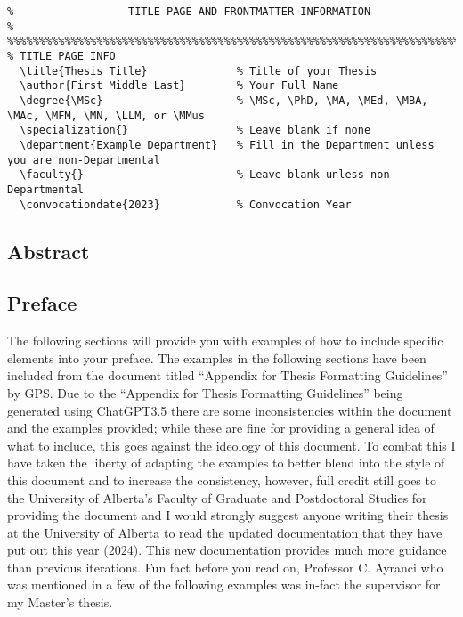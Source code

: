 			\begin{lstlisting}[float=h,caption=Example of How to Set Title Page Info,label=lst:TitlePage,style=LaTeXStyle,basicstyle=\scriptsize\ttfamily,]
%%%%%%%%%%%%%%%%%%%%%%%%%%%%%%%%%%%%%%%%%%%%%%%%%%%%%%%%%%%%%%%%%%%%%%%%%%%%%%%%
%                  TITLE PAGE AND FRONTMATTER INFORMATION                      %
%%%%%%%%%%%%%%%%%%%%%%%%%%%%%%%%%%%%%%%%%%%%%%%%%%%%%%%%%%%%%%%%%%%%%%%%%%%%%%%%
% TITLE PAGE INFO
  \title{Thesis Title}              % Title of your Thesis
  \author{First Middle Last}        % Your Full Name
  \degree{\MSc}                     % \MSc, \PhD, \MA, \MEd, \MBA, \MAc, \MFM, \MN, \LLM, or \MMus
  \specialization{}                 % Leave blank if none
  \department{Example Department}   % Fill in the Department unless you are non-Departmental
  \faculty{}                        % Leave blank unless non-Departmental
  \convocationdate{2023}            % Convocation Year
			\end{lstlisting}
	
		\subsection{Abstract}
			

		\subsection{Preface}
			The following sections will provide you with examples of how to include specific elements into your preface.
			The examples in the following sections have been included from the document titled ``Appendix for Thesis Formatting Guidelines'' by GPS\cite{FGPS2024}.
			Due to the ``Appendix for Thesis Formatting Guidelines'' being generated using ChatGPT3.5 there are some inconsistencies within the document and the examples provided; while these are fine for providing a general idea of what to include, this goes against the ideology of this document.
			To combat this I have taken the liberty of adapting the examples to better blend into the style of this document and to increase the consistency, however, full credit still goes to the University of Alberta's Faculty of Graduate and Postdoctoral Studies for providing the document and I would strongly suggest anyone writing their thesis at the University of Alberta to read the updated documentation that they have put out this year (2024).
			This new documentation provides much more guidance than previous iterations.
			Fun fact before you read on, Professor C. Ayranci who was mentioned in a few of the following examples was in-fact the supervisor for my Master's thesis.
			
